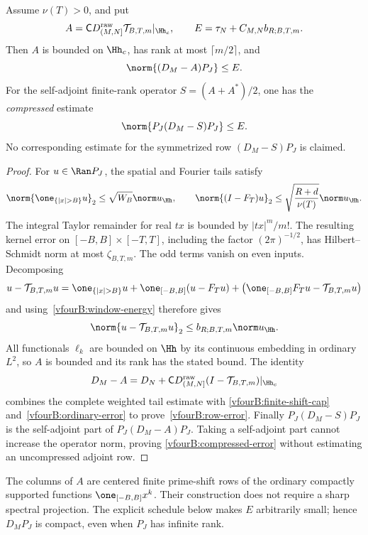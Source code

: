 \begin{theorem}
\label{vfourB:approximation-theorem}
Assume $\nu(T)>0$, and put
\[
 A=\mathsf C D_{(M,N]}^{\mathrm{raw}}
                   \mathcal T_{B,T,m}|_{\Hh_c},\qquad
 E=\tau_N+C_{M,N}b_{R;B,T,m}.
\]
Then $A$ is bounded on $\Hh_c$, has rank at most $\lceil m/2\rceil$, and
\begin{equation}\label{vfourB:row-error}
 \norm{(D_M-A)P_J}\le E.
\end{equation}
For the self-adjoint finite-rank operator $S=(A+A^*)/2$, one has the
\emph{compressed} estimate
\begin{equation}\label{vfourB:compressed-error}
 \norm{P_J(D_M-S)P_J}\le E.
\end{equation}
No corresponding estimate for the symmetrized row $(D_M-S)P_J$ is claimed.
\end{theorem}
\begin{proof}
For $u\in\Ran P_J$, the spatial and Fourier tails satisfy
\[
 \norm{\one_{\{|x|>B\}}u}_2\le\sqrt{W_B}\norm u_{\Hh},\qquad
 \norm{(I-F_T)u}_2
 \le\sqrt{\frac{R+d}{\nu(T)}}\norm u_{\Hh}.
\]
The integral Taylor remainder for real $tx$ is bounded by
$|tx|^m/m!$. The resulting kernel error on
$[-B,B]\times[-T,T]$, including the factor $(2\pi)^{-1/2}$, has
Hilbert--Schmidt norm at most $\zeta_{B,T,m}$. The odd terms vanish on even
inputs. Decomposing
\[
 u-\mathcal T_{B,T,m}u
 =\one_{\{|x|>B\}}u+\one_{[-B,B]}(u-F_Tu)
   +\bigl(\one_{[-B,B]}F_Tu-\mathcal T_{B,T,m}u\bigr)
\]
and using~\eqref{vfourB:window-energy} therefore gives
\begin{equation}\label{vfourB:ordinary-error}
 \norm{u-\mathcal T_{B,T,m}u}_2
 \le b_{R;B,T,m}\norm u_{\Hh}.
\end{equation}
All functionals $\ell_k$ are bounded on $\Hh$ by its continuous embedding
in ordinary $L^2$, so $A$ is bounded and its rank has the stated bound.
The identity
\[
 D_M-A=D_N+\mathsf C D_{(M,N]}^{\mathrm{raw}}
                         (I-\mathcal T_{B,T,m})|_{\Hh_c}
\]
combines the complete weighted tail estimate with
\eqref{vfourB:finite-shift-cap} and~\eqref{vfourB:ordinary-error} to
prove~\eqref{vfourB:row-error}. Finally
$P_J(D_M-S)P_J$ is the self-adjoint part of $P_J(D_M-A)P_J$.
Taking a self-adjoint part cannot increase the operator norm, proving
\eqref{vfourB:compressed-error} without estimating an uncompressed
adjoint row.
\end{proof}

The columns of $A$ are centered finite prime-shift rows of the ordinary
compactly supported functions $\one_{[-B,B]}x^k$. Their construction does
not require a sharp spectral projection. The explicit schedule below
makes $E$ arbitrarily small; hence $D_MP_J$ is compact, even when $P_J$
has infinite rank.

